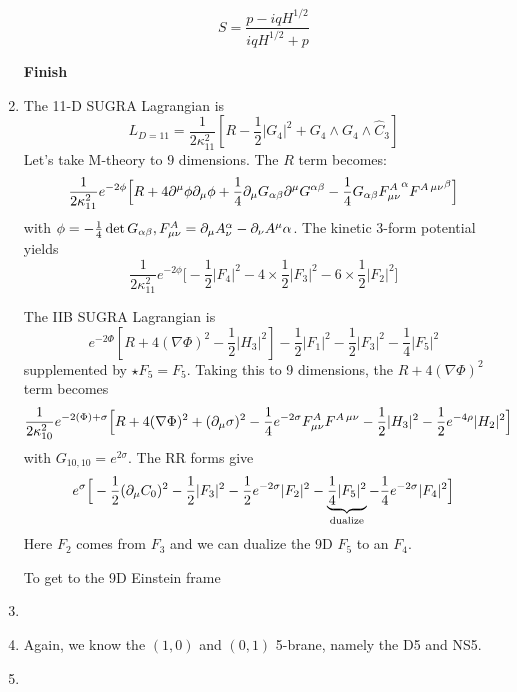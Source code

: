 \documentclass[11pt, class=article, crop=false]{standalone}
\begin{document}
\begin{enumerate}
	\[
		S = \frac{p - i q H^{1/2}}{i q H^{1/2} + p}
	\]
	
	
	
	\textbf{Finish}
	
	\item The 11-D SUGRA Lagrangian is
	\[
		L_{D=11} = \frac{1}{2\kappa_{11}^2}\left[R - \frac12 |G_4|^2 + G_4 \wedge G_4 \wedge \hat C_3 \right]
	\]
	Let's take M-theory to $9$ dimensions. The $R$ term becomes:
	\[
		\frac{1}{2 \kappa_{11}^2} e^{-2 \phi} \Big[R + 4 \partial^\mu \phi \partial_\mu \phi + \frac14 \partial_\mu G_{\alpha \beta} \partial^\mu G^{\alpha \beta} - \frac14 G_{\alpha \beta} {F_{\mu \nu}^A}^\alpha {F^{A\, \mu \nu}}^\beta \Big]
	\]
	with $\phi = -\frac14 \det G_{\alpha \beta}, F_{\mu \nu}^A = \partial_\mu A_\nu^\alpha - \partial_\nu A^\mu \alpha$. The kinetic 3-form potential yields
	\[
		\frac{1}{2 \kappa_{11}^2} e^{-2 \phi} \Big[-\frac12 |F_4|^2 - 4 \times \frac12 |F_3|^2 - 6 \times \frac12 |F_2|^2 \Big]
	\]
	
	The IIB SUGRA Lagrangian is
	\[
		e^{-2\Phi} \left[R + 4 (\nabla \Phi)^2 - \frac12 |H_3|^2 \right] - \frac12 |F_1|^2 - \frac12 |F_3|^2 - \frac14 |F_5|^2
	\]
	supplemented by $\star F_5 = F_5$. Taking this to 9 dimensions, the $R + 4 (\nabla \Phi)^2$ term becomes
	\[
		\frac{1}{2 \kappa_{10}^2} e^{-2 (\Phi) + \sigma} \Big[R + 4 (\nabla \Phi)^2 + (\partial_\mu \sigma)^2 - \frac14 e^{-2 \sigma} {F_{\mu \nu}^A} {F^{A\, \mu \nu}}  - \frac{1}{2} |H_3|^2 - \frac12 e^{-4 \rho} |H_{2}|^2 \Big]
	\]
	with $G_{10,10} = e^{2 \sigma}$. The RR forms give
	\[
		e^{\sigma} \Big[ -\frac12 (\partial_\mu C_0)^2 - \frac12 |F_3|^2 - \frac12 e^{-2 \sigma} |F_2|^2 - \underbrace{\frac14 |F_5|^2}_{\text{dualize} } - \frac14 e^{-2\sigma} |F_4|^2 \Big]
	\]
	Here $F_2$ comes from $F_3$ and we can dualize the 9D $F_5$ to an $F_4$.
	
	To get to the 9D Einstein frame 
	\item 
	
	\item Again, we know the $(1,0)$ and $(0,1)$ 5-brane, namely the D5 and NS5. 
	
	\item 
	
	
\end{enumerate}

\end{document}
